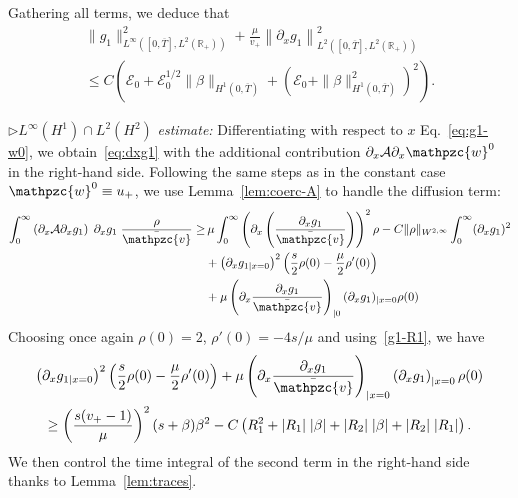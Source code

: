 \documentclass[AHL,Unicode,longabstracts,published]{cedram}
\newcommand{\R}{\mathbb{R}}
\newcommand{\p}{\partial}
\newcommand{\bv}{\bar{\mathpzc{v}}}
\newcommand{\cA}{\mathcal A}
\newcommand{\cE}{\mathcal E}
\newcommand{\tw}{\mathpzc{w}}
\begin{document}
Gathering all terms, we deduce that
\begin{multline}\label{borne-g1-L2H1-bis}
 \|g_1\|_{L^\infty\left([0,\overline{T}], L^2(\R_+)\right)}^2 + \frac{\mu}{v_+}\left\|\p_x g_1\right\|_{L^2\left([0,\overline{T}], L^2(\R_+)\right)}^2\\
 \leq C \left(\cE_0+ {\cE_0^{1/2} \|\beta\|_{H^1\left(0, \overline{T}\right)}} + \left(\cE_0 + \|\beta\|_{H^1 \left(0, \overline{T}\right)}^2\right)^2\right).
\end{multline}



$\rhd L^{\infty}(H^1)\cap L^2(H^2)$ \emph{estimate:} Differentiating with respect to $x$ Eq.~\eqref{eq:g1-w0}, we obtain~\eqref{eq:dxg1} with the additional contribution $\partial_x \cA \partial_x \tw^0$ in the right-hand side. Following the same steps as in the constant case $\tw^0 \equiv u_+$, we use Lemma~\ref{lem:coerc-A} to handle the diffusion term:
\begin{align*}
\int_0^\infty \left(\p_x \cA \p_x g_1\right) \;\p_x g_1 \; \frac{\rho}{\bv } \geq&\, \mu \int_0^\infty \left(\p_x \left(\frac{\p_x g_1}{\bv}\right)\right)^2 \rho - C \|\rho\|_{W^{2,\infty}}\int_0^\infty (\p_x g_1)^2\\
&+ \left(\p_x g_{1|x=0}\right)^2 \left(\frac{s}{2} \rho(0)- \frac{\mu}{2}\rho'(0)\right) \\
&+ \mu \left(\partial_x\dfrac{\partial_x g_1}{\bv}\right)_{|0} (\partial_x g_1)_{|x=0} \rho(0)
\end{align*}
Choosing once again $\rho(0)=2$, $\rho'(0)=-4s/\mu$ and using~\eqref{g1-R1}, we have
\begin{multline*}
\left(\p_x g_{1|x=0}\right)^2 \left(\frac{s}{2} \rho(0)- \frac{\mu}{2}\rho'(0)\right) + \mu \left(\partial_x\dfrac{\partial_x g_1}{\bv}\right)_{|x=0} \left(\partial_x g_1\right)_{|x=0} \rho(0)\\
\geq \left(\frac{s(v_+-1)}{\mu}\right)^2(s+\beta) \beta^2 -C\left(R_1^2 + |R_1|\; |\beta| + |R_2|\; |\beta| + |R_2|\; |R_1|\right).
\end{multline*}
We then control the time integral of the second term in the right-hand side thanks to Lemma~\ref{lem:traces}.
\end{document}
